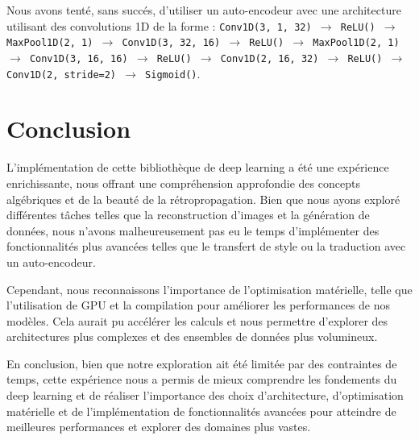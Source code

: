 \documentclass{article}
\begin{document}
Nous avons tenté, sans succés, d'utiliser un auto-encodeur avec une architecture utilisant des convolutions 1D de la forme : \texttt{Conv1D(3, 1, 32) $\rightarrow$ ReLU() $\rightarrow$ MaxPool1D(2, 1) $\rightarrow$ Conv1D(3, 32, 16) $\rightarrow$ ReLU() $\rightarrow$ MaxPool1D(2, 1) $\rightarrow$ Conv1D(3, 16, 16) $\rightarrow$ ReLU() $\rightarrow$ Conv1D(2, 16, 32) $\rightarrow$ ReLU() $\rightarrow$ Conv1D(2, stride=2) $\rightarrow$ Sigmoid()}. 

\section{Conclusion}

L'implémentation de cette bibliothèque de deep learning a été une expérience enrichissante, nous offrant une compréhension approfondie des concepts algébriques et de la beauté de la rétropropagation. Bien que nous ayons exploré différentes tâches telles que la reconstruction d'images et la génération de données, nous n'avons malheureusement pas eu le temps d'implémenter des fonctionnalités plus avancées telles que le transfert de style ou la traduction avec un auto-encodeur. 

Cependant, nous reconnaissons l'importance de l'optimisation matérielle, telle que l'utilisation de GPU et la compilation pour améliorer les performances de nos modèles. Cela aurait pu accélérer les calculs et nous permettre d'explorer des architectures plus complexes et des ensembles de données plus volumineux. 

En conclusion, bien que notre exploration ait été limitée par des contraintes de temps, cette expérience nous a permis de mieux comprendre les fondements du deep learning et de réaliser l'importance des choix d'architecture, d'optimisation matérielle et de l'implémentation de fonctionnalités avancées pour atteindre de meilleures performances et explorer des domaines plus vastes.
\end{document}
